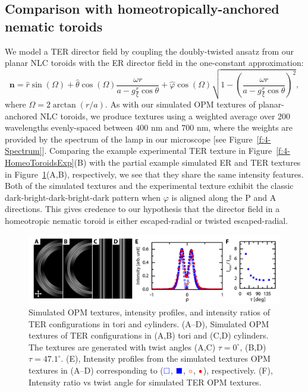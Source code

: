 \subsection{Comparison with homeotropically-anchored nematic toroids}
We model a TER director field by coupling the doubly-twisted ansatz from our planar NLC toroids with the ER director field in the one-constant approximation:
\begin{equation}
  \mathbf{n} = \hat{r} \sin(\Omega)
  + \hat{\theta}\cos(\Omega)\frac{\omega r}{a- g \frac{r}{\xi} \cos \theta}
  + \hat{\varphi}\cos(\Omega)\sqrt{1 - \left ( \frac{\omega r}{a-g \frac{r}{\xi} \cos \theta} \right )^2 },\label{e:4-TERansatz}
\end{equation}
where $\Omega = 2 \arctan(r/a)$.
As with our simulated OPM textures of planar-anchored NLC toroids, we produce textures using a weighted average over 200 wavelengths evenly-spaced between $400$ nm and $700$ nm, where the weights are provided by the spectrum of the lamp in our microscope [see Figure~\ref{f:4-Spectrum}].
Comparing the example experimental TER texture in Figure~\ref{f:4-HomeoToroidsExp}(B) with the partial example simulated ER and TER textures in Figure~\ref{f:4-I0I45vsTwist}(A,B), respectively, we see that they share the same intensity features.
Both of the simulated textures and the experimental texture exhibit the classic dark-bright-dark-bright-dark pattern when $\varphi$ is aligned along the P and A directions.
This gives credence to our hypothesis that the director field in a homeotropic nematic toroid is either escaped-radial or twisted escaped-radial.
\begin{figure}
  \centering
  \includegraphics{figures/C4/Ch4-Figs_I0I45vsTwist.png}
  \caption{Simulated OPM textures, intensity profiles, and intensity ratios of TER configurations in tori and cylinders.
  (A--D), Simulated OPM textures of TER configurations in (A,B) tori and (C,D) cylinders.
  The textures are generated with twist angles (A,C) $\tau = 0^{\circ}$, (B,D) $\tau = 47.1^\circ$.
  (E), Intensity profiles from the simulated textures OPM textures in (A--D) corresponding to (${\color{blue} \square}$, ${\color{blue} \blacksquare}$, ${\color{red} \circ}$, ${\color{red} \bullet}$), respectively.
  (F), Intensity ratio vs twist angle for simulated TER OPM textures.}\label{f:4-I0I45vsTwist}
\end{figure}

